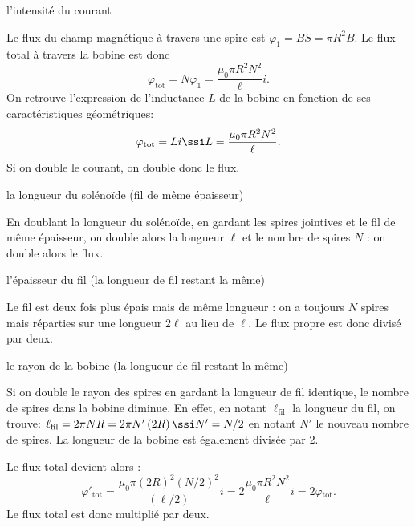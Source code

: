 \begin{enonce}
l'intensité du courant
\end{enonce}
\begin{corrige}
Le flux du champ magnétique à travers une spire est $\varphi_{1}=BS=\pi R^{2}B$.
Le flux total à travers la bobine est donc 
\[
\varphi_{\text{tot}}=N\varphi_{1}=\dfrac{\mu_{0}\pi R^{2}N^{2}}{\ell}i.
\]
On retrouve l'expression de l'inductance $L$ de la bobine en fonction de ses caractéristiques géométriques:
\[
\varphi_{\text{tot}}=Li \ssi L=\dfrac{\mu_{0}\pi R^{2}N^{2}}{\ell}.
\]
Si on double le courant, on double donc le flux.
\end{corrige}


\begin{enonce}
la longueur du solénoïde (fil de même épaisseur)
\end{enonce}
\begin{corrige}
En doublant la longueur du solénoïde, en gardant les spires jointives et le fil de même épaisseur, on double alors la longueur $\ell$ et le nombre de spires $N$ : on double alors le flux.
\end{corrige}


\begin{enonce}
l'épaisseur du fil (la longueur de fil restant la même)
\end{enonce}
\begin{corrige}
Le fil est deux fois plus épais mais de même longueur : on a toujours $N$ spires mais réparties sur une longueur $2\ell$ au lieu de $\ell$.
Le flux propre est donc divisé par deux.
\end{corrige}

\begin{enonce}
le rayon de la bobine (la longueur de fil restant la même)
\end{enonce}
\begin{corrige}
Si on double le rayon des spires en gardant la longueur de fil identique, le nombre de spires dans la bobine diminue. En effet, en notant $\ell_{\text{fil}}$ la longueur du fil, on trouve: $\ell_{\text{fil}}=2\pi NR=2\pi N'\left(2R\right)\ssi N'=N/2$ en notant $N'$ le nouveau nombre de spires.
La longueur de la bobine est également divisée par 2.

Le flux total devient alors :
\[
\varphi'_{\text{tot}}=\dfrac{\mu_{0}\pi\left(2R\right)^{2}\left(N/2\right)^{2}}{\left(\ell/2\right)}i=2\dfrac{\mu_{0}\pi R^{2}N^{2}}{\ell}i=2\varphi{}_{\text{tot}}.
\]
 Le flux total est donc multiplié par deux.
\end{corrige}

